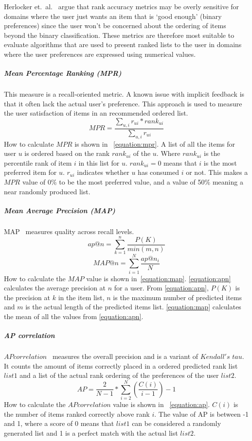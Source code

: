 Herlocker et.\ al.~\cite{Herlocker2004} argue that rank accuracy metrics may be
overly sensitive for domains where the user just wants an item that is `good
enough' (binary preferences) since the user won't be concerned about the
ordering of items beyond the binary classification. These metrics are therefore
most suitable to evaluate algorithms that are used to present ranked lists to
the user in domains where the user preferences are expressed using numerical
values.

\subparagraph{Mean Percentage Ranking (MPR)}
\label{subp:mean_percentage_ranking_}
This measure is a recall-oriented metric.
A known issue with implicit feedback is that it often lack the actual user's preference.
This approach is used to measure the user satisfaction of items in an recommended ordered list.
\begin{equation}
	MPR = \frac{\sum_{u,i}{r_{ui} * rank_{ui}}}{\sum_{u,i}{r_{ui}}}
	\label{equation:mpr}
\end{equation}
How to calculate $MPR$ is shown in ~\ref{equation:mpr}.
A list of all the items for user $u$ is ordered based on the rank $rank_{ui}$ of the $u$.
Where $rank_{ui}$ is the percentile rank of item $i$ in this list for $u$.
$rank_{ui} = 0$ means that $i$ is the most preferred item for $u$.
$r_{ui}$ indicates whether $u$ has consumed $i$ or not.
This makes a $MPR$ value of 0\% to be the most preferred value, and a value of 50\% meaning a near randomly produced list.

\subparagraph{Mean Average Precision (MAP)}
\label{subp:mean_average_precision_map_}
MAP~\cite{Manning:2008:IIR:1394399} measures quality across recall levels.
\begin{equation}
	ap@n = \sum_{k=1}^{n}{\frac{P(K)}{min(m,n)}}
	\label{equation:apn}
\end{equation}
\begin{equation}
	MAP@n = \sum_{i=1}^{N}{\frac{ap@n_i}{N}}
	\label{equation:map}
\end{equation}
How to calculate the $MAP$ value is shown in~\ref{equation:map}.
\ref{equation:apn} calculates the average precision at $n$ for a user.
From \ref{equation:apn}, $P(K)$ is the precision at $k$ in the item list, $n$ is the maximum number of predicted items and $m$ is the actual length of the predicted items list.
\ref{equation:map} calculates the mean of all the values from \ref{equation:apn}.

\subparagraph{AP correlation}
\label{subp:ap_correlation}
$AP correlation$~\cite{Yilmaz:2008:NRC:1390334.1390435} measures the overall precision and is a variant of $Kendall's$ $tau$.
It counts the amount of items correctly placed in a ordered predicted rank list $list1$ and a list of the actual rank ordering of the preferences of the user $list2$.
\begin{equation}
	AP = \frac{2}{N - 1} * \sum_{i=2}^{N}{(\frac{C(i)}{i - 1})} - 1
	\label{equation:ap}
\end{equation}
How to calculate the $AP correlation$ value is shown in ~\ref{equation:ap}.
$C(i)$ is the number of items ranked correctly above rank $i$.
The value of AP is between -1 and 1, where a score of 0 means that $list1$ can be considered a randomly generated list and 1 is a perfect match with the actual list $list2$.

